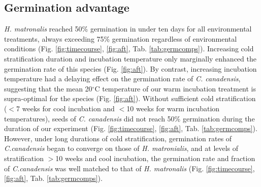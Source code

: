 \documentclass{article}[11pt]
\begin{document}
\subsection*{Germination advantage}
\textit{H. matronalis} reached 50\% germination in under ten days for all environmental treatments, always exceeding 75\% germination regardless of environmental conditions (Fig. \ref{fig:timecourse}, \ref{fig:aft}, Tab. \ref{tab:germcomps}). Increasing cold stratification duration and incubation temperature only marginally enhanced the germination rate of this species (Fig. \ref{fig:aft}). By contrast, increasing incubation temperature had a delaying effect on the germination rate of \textit{C. canadensis}, suggesting that the mean 20$^{\circ}$C temperature of our warm incubation treatment is supra-optimal for the species (Fig. \ref{fig:aft}). Without sufficient cold stratification ($<$7 weeks for cool incubation and $<$10 weeks for warm incubation temperatures), seeds of  \textit{C. canadensis} did not reach 50\% germination during the duration of our experiment (Fig. \ref{fig:timecourse}, \ref{fig:aft}, Tab. \ref{tab:germcomps}). However, under long durations of cold stratification, germination rates of \textit{C.canadensis} began to converge on those of \textit{H. matronialis}, and at levels of stratification $>$10 weeks and cool incubation, the germination rate and fraction of \textit{C.canadensis} was well matched to that of \textit{H. matronalis} (Fig. \ref{fig:timecourse}, \ref{fig:aft}, Tab. \ref{tab:germcomps}).
%
\end{document}

